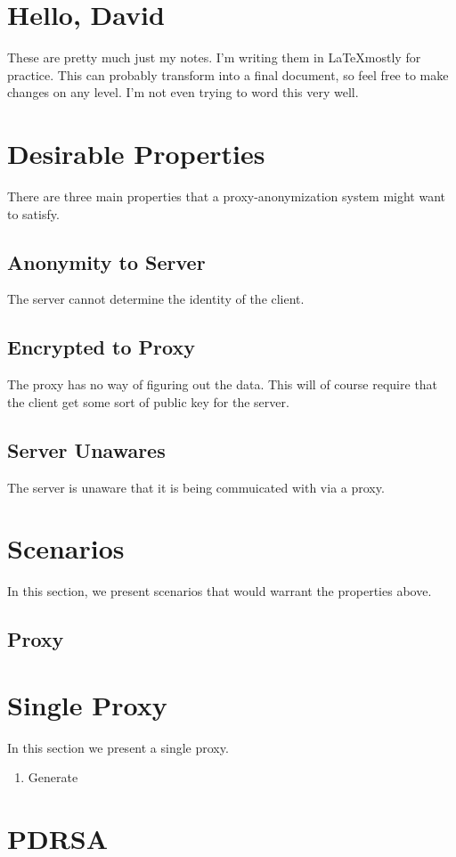 \documentclass{article}
\begin{document}
\section{Hello, David}
These are pretty much just my notes.  I'm writing them in \LaTeX mostly for practice.  This can probably transform into a final document, so feel free to make changes on any level.  I'm not even trying to word this very well.
\section{Desirable Properties}
There are three main properties that a proxy-anonymization system might want to satisfy.
\subsection{Anonymity to Server}
The server cannot determine the identity of the client.
\subsection{Encrypted to Proxy}
The proxy has no way of figuring out the data.  This will of course require that the client get some sort of public key for the server.
\subsection{Server Unawares}
The server is unaware that it is being commuicated with via a proxy.
\section{Scenarios}
In this section, we present scenarios that would warrant the properties above.
\subsection{ Proxy}
\subsection{}
\section{Single Proxy}
In this section we present a single proxy. 
\begin{enumerate}
\item Generate
\end{enumerate}
\section{PDRSA}
\end{document}
